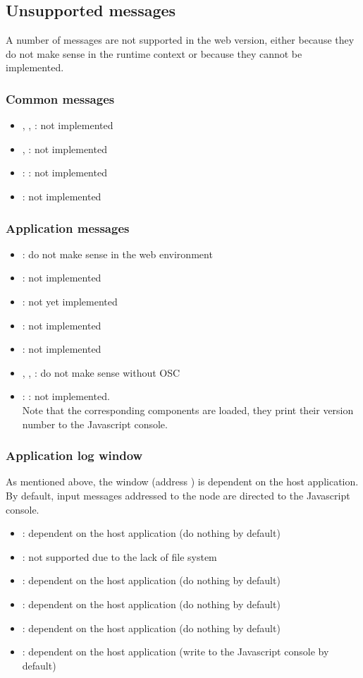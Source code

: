 \documentclass[a4paper,twoside]{article}
\newcommand{\sublevel}[1]	{\subsection{#1}}
\newcommand{\subsublevel}[1]	{\subsubsection{#1}}
\begin{document}
\sublevel{Unsupported messages}
\label{unsupportedMessages}

A number of messages are not supported in the web version, either because they do not make sense in the runtime context or because they cannot be implemented.

\subsublevel{Common messages}
\label{webcommonMessages}

\begin{itemize}
\item {}, , : not implemented
\item {}, : not implemented
\item {}: : not implemented
\item {}: not implemented
\end{itemize}

\subsublevel{Application messages}
\label{webappMessages}

\begin{itemize}
\item {}: do not make sense in the web environment
\item {}: not implemented
\item {}: not yet implemented
\item {}: not implemented
\item {}: not implemented
\item {}, , : do not make sense without OSC
\item {}:  : not implemented. \\
Note that the corresponding components are loaded, they print their version number to the Javascript console.
\end{itemize}

\subsublevel{Application log window}
\label{weblogMessages}

As mentioned above, the  window (address ) is dependent on the host application. By default, input messages addressed to the  node are directed to the Javascript console.

\begin{itemize}
\item {}: dependent on the host application (do nothing by default)
\item {}: not supported due to the lack of file system
\item {}: dependent on the host application (do nothing by default)
\item {}: dependent on the host application (do nothing by default)
\item {}: dependent on the host application (do nothing by default)
\item {}: dependent on the host application (write to the Javascript console by default)
\end{itemize}
\end{document}
